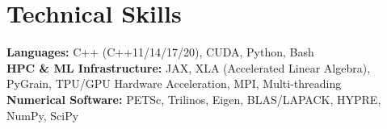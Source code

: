 \documentclass[10pt,letterpaper]{article}
\begin{document}
\section{Technical Skills}
\noindent\textbf{Languages:} C++ (C++11/14/17/20), CUDA, Python, Bash \\
\noindent\textbf{HPC \& ML Infrastructure:} JAX, XLA (Accelerated Linear Algebra), PyGrain, TPU/GPU Hardware Acceleration, MPI, Multi-threading \\
\noindent\textbf{Numerical Software:} PETSc, Trilinos, Eigen, BLAS/LAPACK, HYPRE, NumPy, SciPy
\end{document}
